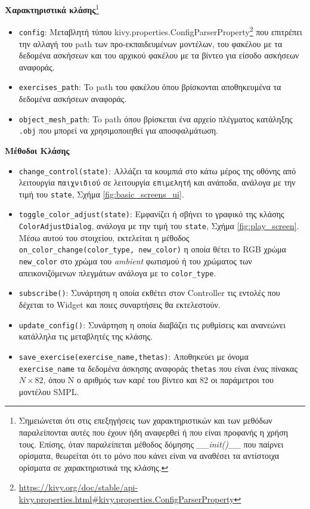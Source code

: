 \noindent\textbf{Χαρακτηριστικά κλάσης}\footnote{Σημειώνεται ότι στις επεξηγήσεις των χαρακτηριστικών και των μεθόδων παραλείπονται αυτές που έχουν ήδη αναφερθεί ή που είναι προφανής η χρήση τους. Επίσης, όταν παραλείπεται μέθοδος δόμησης \textsl{\_\_init()\_\_} που παίρνει ορίσματα, θεωρείται ότι το μόνο που κάνει είναι να αναθέσει τα αντίστοιχα ορίσματα σε χαρακτηριστικά της κλάσης.}
\begin{itemize}
	\item \texttt{config}: Μεταβλητή τύπου kivy.properties.ConfigParserProperty\footnote{\href{https://kivy.org/doc/stable/api-kivy.properties.html\#kivy.properties.ConfigParserProperty}{https://kivy.org/doc/stable/api-kivy.properties.html\#kivy.properties.ConfigParserProperty}} που επιτρέπει την αλλαγή του path των προ-εκπαιδευμένων μοντέλων, του φακέλου με τα δεδομένα ασκήσεων και του αρχικού φακέλου με τα βίντεο για είσοδο ασκήσεων αναφοράς.
	\item \texttt{exercises\_path}: To path του φακέλου όπου βρίσκονται αποθηκευμένα τα δεδομένα ασκήσεων αναφοράς.
	\item \texttt{object\_mesh\_path}: To path όπου βρίσκεται ένα αρχείο πλέγματος κατάληξης \texttt{.obj} που μπορεί να χρησιμοποιηθεί για αποσφαλμάτωση.
\end{itemize}

\noindent\textbf{Μέθοδοι Κλάσης}
\begin{itemize}
	\item \texttt{change\_control(state)}: Αλλάζει τα κουμπιά στο κάτω μέρος της οθόνης από λειτουργία \texttt{παιχνιδιού} σε λειτουργία \texttt{επιμελητή} και ανάποδα, ανάλογα με την τιμή του \texttt{state}, Σχήμα \ref{fig:basic_screens_ui}. 
	\item \texttt{toggle\_color\_adjust(state)}: Εμφανίζει ή σβήνει το γραφικό της κλάσης \texttt{ColorAdjustDialog}, ανάλογα με την τιμή του \texttt{state}, Σχήμα \ref{fig:play_screen}. Μέσω αυτού του στοιχείου, εκτελείται η μέθοδος \texttt{on\_color\_change(color\_type, new\_color)} η οποία θέτει το RGB χρώμα \texttt{new\_color} στο χρώμα του \textsl{ambient} φωτισμού ή του χρώματος των απεικονιζόμενων πλεγμάτων ανάλογα με το \texttt{color\_type}.
	\item \texttt{subscribe()}: Συνάρτηση η οποία εκθέτει στον Controller τις εντολές που δέχεται το Widget και ποιες συναρτήσεις θα εκτελεστούν.
	\item \texttt{update\_config()}: Συνάρτηση η οποία διαβάζει τις ρυθμίσεις και ανανεώνει κατάλληλα τις μεταβλητές της κλάσης.
	\item \texttt{save\_exercise(exercise\_name,thetas)}: Αποθηκεύει με όνομα \texttt{exercise\_name} τα δεδομένα άσκησης αναφοράς \texttt{thetas} που είναι ένας πίνακας $N \times 82$, όπου N ο αριθμός των καρέ του βίντεο και 82 οι παράμετροι του μοντέλου SMPL.
\end{itemize}

